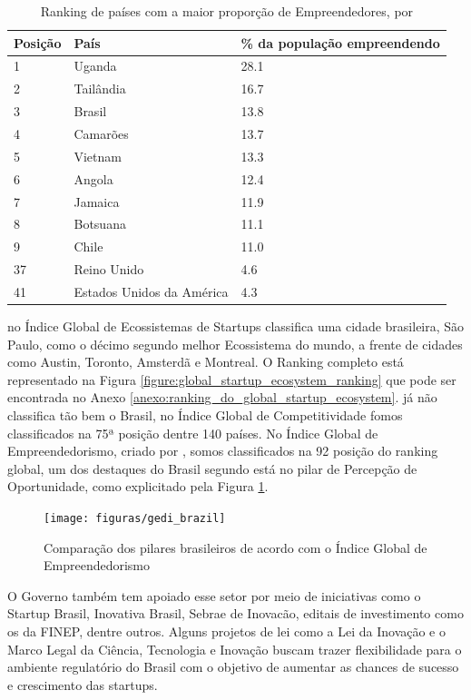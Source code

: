 \begin{table}[!htb]
	\centering
	\begin{tabular}{ | p{3cm} | p{8cm} | p{4cm} | }
		\hline
		Posição & País & \% da população empreendendo \\ \hline
		1 & Uganda & 28.1 \\ \hline
		2 & Tailândia & 16.7 \\ \hline
		3 & Brasil & 13.8 \\ \hline
		4 & Camarões & 13.7 \\ \hline
		5 & Vietnam & 13.3 \\ \hline
		6 & Angola & 12.4 \\ \hline
		7 & Jamaica & 11.9 \\ \hline
		8 & Botsuana & 11.1 \\ \hline
		9 & Chile & 11.0 \\ \hline
		37 & Reino Unido & 4.6 \\ \hline
		41 & Estados Unidos da América & 4.3 \\ \hline
	\end{tabular}
	\caption{Ranking de países com a maior proporção de Empreendedores, por \cite{Brinded2015}}	\label{table:ranking_de_paises_com_mais_empreendedores}
\end{table}

 no Índice Global de Ecossistemas de Startups classifica uma cidade brasileira, São Paulo, como o décimo segundo melhor Ecossistema do mundo, a frente de cidades como Austin, Toronto, Amsterdã e Montreal. O Ranking completo está representado na Figura \ref{figure:global_startup_ecosystem_ranking} que pode ser encontrada no Anexo \ref{anexo:ranking_do_global_startup_ecosystem}.  já não classifica tão bem o Brasil, no Índice Global de Competitividade fomos classificados na 75ª posição dentre 140 países. No Índice Global de Empreendedorismo, criado por , somos classificados na 92 posição do ranking global, um dos destaques do Brasil segundo  está no pilar de Percepção de Oportunidade, como explicitado pela Figura \ref{figure:gedi_brazil}.

\begin{figure}[!htb]
	\centering
	\texttt{[image: figuras/gedi\_brazil]}
	\caption{Comparação dos pilares brasileiros de acordo com o Índice Global de Empreendedorismo}
	\label{figure:gedi_brazil}
\end{figure}

O Governo também tem apoiado esse setor por meio de iniciativas como o Startup Brasil, Inovativa Brasil, Sebrae de Inovacão, editais de investimento como os da FINEP, dentre outros. Alguns projetos de lei como a Lei da Inovação e o Marco Legal da Ciência, Tecnologia e Inovação buscam trazer flexibilidade para o ambiente regulatório do Brasil com o objetivo de aumentar as chances de sucesso e crescimento das startups. 

